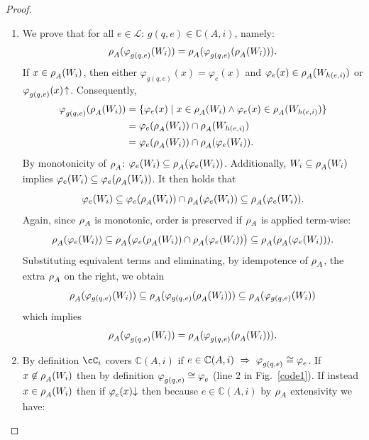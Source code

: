\documentclass[runningheads]{llncs}
\def\ok#1{\mbox{\raisebox{0ex}[1ex][1ex]{$#1$}}}
\def\bbbc{{\mathbb{C}}}
\newcommand{\ccL}{\mathscr{L}}
\newcommand{\pfunction}[3]{\ok{\varphi^{#2\, #3}_{#1}}}
\newcommand{\auco}[2]{\ok{\rho^{#1}_{#2}}}
\newcommand{\Ra}{\Rightarrow}
\def\ok#1{\mbox{\raisebox{0ex}[1ex][1ex]{$#1$}}}
\def\cAA{\ensuremath{A}}
\begin{document}
\begin{proof}
\begin{enumerate}
        \item We prove that for all $e\in\ccL$: $g(q,e)\in \bbbc(\cAA,i)$, namely:
        \[
            \auco{}{A}(\pfunction{g(q,e)}{}{}(W_i)) 
                = \auco{}{A}(\pfunction{g(q,e)}{}{}(\auco{}{A}(W_i))).
        \]
        If \(x \in \auco{}{A}(W_i)\), then either \(\varphi_{g(q,e)}(x) = \varphi_e(x)\) and \(\varphi_e(x) \in 
        \auco{}{A}(W_{h(e,i)})\) or \(\pfunction{g(q,e)}{}{}(x)\!\uparrow\). Consequently,
        \begin{align*}
            \pfunction{g(q,e)}{}{}(\auco{}{A}(W_i))
                &= \{\varphi_e(x) \;\vert\; x \in \auco{}{A}(W_i) 
                    \land \varphi_e(x) \in \auco{}{A}(W_{h(e,i)})\} \\
            &= \varphi_e(\auco{}{A}(W_i)) \cap \auco{}{A}(W_{h(e,i)}) \\
            &= \varphi_e(\auco{}{A}(W_i)) \cap \auco{}{A}(\varphi_e(W_i)).
        \end{align*}
        By monotonicity of \(\auco{}{A}\): \(\varphi_e(W_i) \subseteq
        \auco{}{A}(\varphi_e(W_i))\). Additionally, \(W_i \subseteq \auco{}{A}(W_i)\)
        implies \(\varphi_e(W_i) \subseteq \varphi_e(\auco{}{A}(W_i))\). It then holds
        that
        \[
            \varphi_e(W_i) 
                \subseteq \varphi_e(\auco{}{A}(W_i)) \cap \auco{}{A}(\varphi_e(W_i))
                \subseteq \auco{}{A}(\varphi_e(W_i)).
        \]
        Again, since \(\auco{}{A}\) is monotonic, order is preserved if \(\auco{}{A}\)
        is applied term-wise:
        \[
            \auco{}{A}(\varphi_e(W_i)) 
                \subseteq \auco{}{A}\big(\varphi_e(\auco{}{A}(W_i))
                    \cap \auco{}{A}(\varphi_e(W_i))\big)
                \subseteq \auco{}{A}(\auco{}{A}(\varphi_e(W_i))).
        \]
        Substituting equivalent terms and eliminating, by idempotence of \(\auco{}{A}\),
        the extra \(\auco{}{A}\) on the right, we obtain
        \[
            \auco{}{A}(\varphi_{g(q,e)}(W_i)) 
                \subseteq \auco{}{A}(\varphi_{g(q,e)}(\auco{}{A}(W_i)))
                \subseteq \auco{}{A}(\varphi_{g(q,e)}(W_i))
        \]
        which implies
        \[
            \auco{}{A}(\pfunction{g(q,e)}{}{}(W_i)) 
                = \auco{}{A}(\pfunction{g(q,e)}{}{}(\auco{}{A}(W_i))).
        \]
        \color{black}
        \item By definition $\cC_i$ covers $\bbbc(\cAA,i)$ if $e\in\bbbc(\cAA,i)~\Ra~\pfunction{g(q,e)}{}{}\cong\pfunction{e}{}{}$. If $x\not\in \auco{}{\cAA}(W_{i})$ then by definition
        $\pfunction{g(q,e)}{}{}\cong\pfunction{e}{}{}$ (line 2 in Fig.~\ref{code1}). If instead $x\in \auco{}{\cAA}(W_{i})$ then if $\pfunction{e}{}{}(x){\downarrow}$ then because $e\in\bbbc(\cAA,i)$ by $\auco{}{\cAA}$ extensivity we have:

\end{enumerate}
\end{proof}
\end{document}
